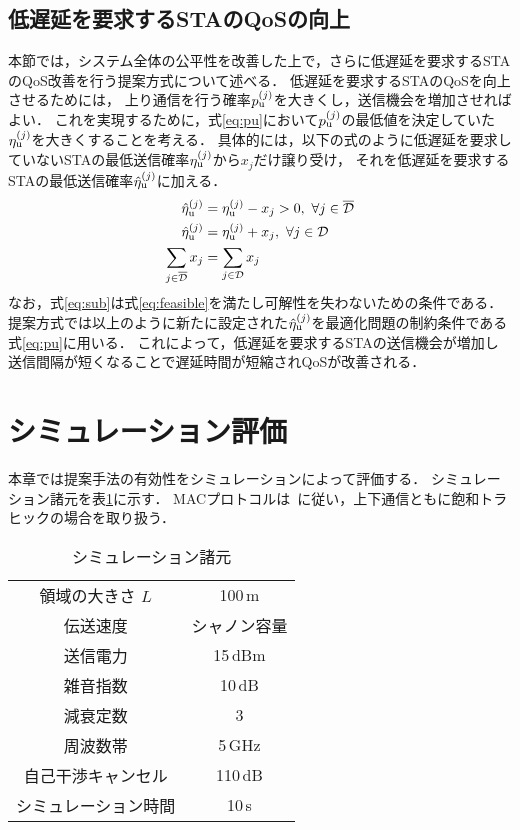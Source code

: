\documentclass[technicalreport]{ieicej}
\newcommand{\etau}{\eta_{\rm u}^{(j)}}
\begin{document}
\subsection{低遅延を要求するSTAのQoSの向上}
	本節では，システム全体の公平性を改善した上で，さらに低遅延を要求するSTAのQoS改善を行う提案方式について述べる．
	低遅延を要求するSTAのQoSを向上させるためには，
	上り通信を行う確率$p_{\rm u}^{(j)}$を大きくし，送信機会を増加させればよい．
	これを実現するために，式\eqref{eq:pu}において$p_{\rm u}^{(j)}$の最低値を決定していた$\etau$を大きくすることを考える．
	具体的には，以下の式のように低遅延を要求していないSTAの最低送信確率$\etau$から$x_j$だけ譲り受け，
	それを低遅延を要求するSTAの最低送信確率${\hat \eta}_{\rm u}^{(j)}$に加える．
	\begin{align}
		{\hat \eta}_{\rm u}^{(j)} &= \etau -x_j > 0,\ \forall j \in {\overline {\mathcal D}} \label{eq:etadbar}\\
		{\hat \eta}_{\rm u}^{(j)} &= \etau + x_j, \ \forall j \in {\mathcal D} \label{eq:etad}\\
		\sum_{j\in{\overline {\mathcal D}}} x_j &= \sum_{j\in{\mathcal D}} x_j \label{eq:sub}
	\end{align}
	なお，式\eqref{eq:sub}は式\eqref{eq:feasible}を満たし可解性を失わないための条件である．
	提案方式では以上のように新たに設定された${\hat \eta}_{\rm u}^{(j)}$を最適化問題の制約条件である式\eqref{eq:pu}に用いる．
	これによって，低遅延を要求するSTAの送信機会が増加し送信間隔が短くなることで遅延時間が短縮されQoSが改善される．

\section{シミュレーション評価}
	本章では提案手法の有効性をシミュレーションによって評価する．
	シミュレーション諸元を表\ref{tab:param}に示す．
	MACプロトコルは~\cite{promac}に従い，上下通信ともに飽和トラヒックの場合を取り扱う．

	\begin{table}[t]
		\centering
		\caption{シミュレーション諸元}
		\label{tab:param}
		\begin{tabular}{cc} \hline
			領域の大きさ $L$ & 100\,m \\
			伝送速度 & シャノン容量 \\
			送信電力 & 15\,dBm \\
			雑音指数 & 10\,dB \\
			減衰定数 & 3 \\
			周波数帯 & 5\,GHz \\
			自己干渉キャンセル & 110\,dB \\
			シミュレーション時間 & 10\,s \\\hline
		\end{tabular}
	\end{table}
\end{document}
